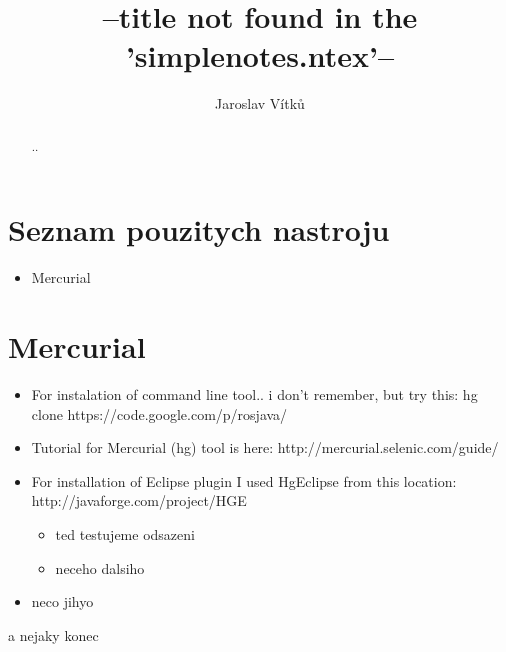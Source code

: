\documentclass[journal,onecolumn]{IEEEtrancz}
\begin{document}
\title{--title not found in the 'simplenotes.ntex'--}
\author{Jaroslav Vítků}

\maketitle

\begin{abstract}
..
\end{abstract}

\IEEEpeerreviewmaketitle




\section{Seznam pouzitych nastroju}


\begin{itemize}
	\item Mercurial


\end{itemize}
\section{Mercurial}


\begin{itemize}
	\item For instalation of command line tool.. i don't remember, but try this: hg clone https://code.google.com/p/rosjava/ 
	\item Tutorial for Mercurial (hg) tool is here: http://mercurial.selenic.com/guide/
		\vspace{3mm}
	\item For installation of Eclipse plugin I used HgEclipse from this location: http://javaforge.com/project/HGE
	\begin{itemize}
		\item ted testujeme odsazeni
		\item neceho dalsiho
	\end{itemize}

	\item neco jihyo
		\vspace{3mm}
\end{itemize}
a nejaky konec
\end{document}
